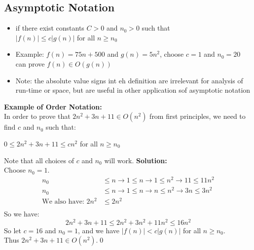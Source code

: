 \documentclass[letterpaper, 12pt]{article}
\newcommand{\red}[1]{{\color{red}{#1}}}
\begin{document}
    \subsection{Asymptotic Notation}
    \red{$O$-notation}
    \begin{itemize}
        \item \red{$f(n) \in O(g(n))$} if there exist constants $C > 0$ and $n_0 > 0$ such that\\
        $|f(n)| \leq c|g(n)|$ for all $n \geq n_0$
        \item Example: $f(n) = 75n + 500$ and $g(n) = 5n^2$, choose $c = 1$ and $n_0 = 20$ can prove $f(n) \in O(g(n))$
        \item Note: the absolute value signs int eh definition are irrelevant for analysis of run-time or space, but are useful in other application sof asymptotic notation
    \end{itemize}
    \textbf{Example of Order Notation:}\\
    In order to prove that $2n^2 + 3n + 11 \in O(n^2)$ from first principles, we need to find $c$ and $n_0$ such that:
    \begin{center}
        $0 \leq 2n^2 + 3n + 11 \leq cn^2$ for all $n \geq n_0$
    \end{center}
    Note that all choices of $c$ and $n_0$ will work.
    \bigskip
    \textbf{Solution:}\\
    Choose $n_0 = 1$.\\
    \begin{align*}
        n_0 &\leq n \rightarrow 1 \leq n \rightarrow 1 \leq n^2 \rightarrow 11 \leq 11n^2\\
        n_0 &\leq n \rightarrow 1 \leq n \rightarrow n \leq n^2 \rightarrow 3n \leq 3n^2\\
        \text{We also have: } 2n^2 &\leq 2n^2\\
    \end{align*}
    So we have:\\
    $$2n^2 + 3n + 11 \leq 2n^2 + 3n^2 + 11n^2 \leq 16n^2$$
    So let $c = 16$ and $n_0 = 1$, and we have $|f(n)| < c|g(n)|$ for all $n \geq n_0$.\\
    Thus $2n^2 + 3n + 11 \in O(n^2)$.\qed\\
    
\end{document}
